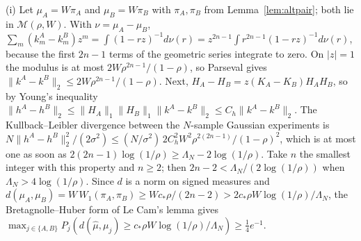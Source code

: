 \documentclass[12pt]{article}
\theoremstyle{definition}
\theoremstyle{remark}
\begin{document}
(i) Let $\mu_A=W\pi_A$ and $\mu_B=W\pi_B$ with $\pi_A,\pi_B$ from Lemma~\ref{lem:altpair}; both lie in $\mathcal M(\rho,W)$. With $\nu=\mu_A-\mu_B$, $\sum_m(k^A_m-k^B_m)z^m=\int(1-rz)^{-1}d\nu(r)=z^{2n-1}\int r^{2n-1}(1-rz)^{-1}d\nu(r)$, because the first $2n-1$ terms of the geometric series integrate to zero. On $|z|=1$ the modulus is at most $2W\rho^{2n-1}/(1-\rho)$, so Parseval gives $\|k^A-k^B\|_2\le2W\rho^{2n-1}/(1-\rho)$. Next, $H_A-H_B=z(K_A-K_B)H_AH_B$, so by Young's inequality $\|h^A-h^B\|_2\le\|H_A\|_1\|H_B\|_1\|k^A-k^B\|_2\le C_h\|k^A-k^B\|_2$. The Kullback--Leibler divergence between the $N$-sample Gaussian experiments is $N\|h^A-h^B\|_2^2/(2\sigma^2)\le(N/\sigma^2)\,2C_h^2W^2\rho^{2(2n-1)}/(1-\rho)^2$, which is at most one as soon as $2(2n-1)\log(1/\rho)\ge\Lambda_N-2\log(1/\rho)$. Take $n$ the smallest integer with this property and $n\ge2$; then $2n-2<\Lambda_N/(2\log(1/\rho))$ when $\Lambda_N>4\log(1/\rho)$. Since $d$ is a norm on signed measures and $d(\mu_A,\mu_B)=W\,W_1(\pi_A,\pi_B)\ge Wc_*\rho/(2n-2)>2c_*\rho W\log(1/\rho)/\Lambda_N$, the Bretagnolle--Huber form of Le Cam's lemma \citep[Lemma 2.6 and Theorem 2.2]{tsybakov2009} gives $\max_{j\in\{A,B\}}P_j(d(\hat\mu,\mu_j)\ge c_*\rho W\log(1/\rho)/\Lambda_N)\ge\tfrac14e^{-1}$.
\end{document}

